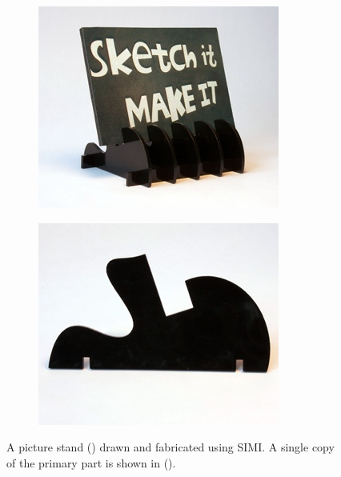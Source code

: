 \begin{figure}
  \centering
  \begin{subfigure}[b]{0.45\textwidth}
    \centering
    \includegraphics[width=\textwidth]{img/simi-stand-withpic.jpg}
    \caption{} %
    \label{fig:example-1}
  \end{subfigure}
  \begin{subfigure}[b]{0.45\textwidth}
    \centering
    \includegraphics[width=\textwidth]{img/simi-stand-part.jpg}
    \caption{} %
    \label{fig:example-2}
  \end{subfigure}
  \caption[Picture frame stand]{A picture stand ()
    drawn and fabricated using SIMI. A single copy of the primary part
    is shown in (). }
  \label{fig:simi-example}
\end{figure}
